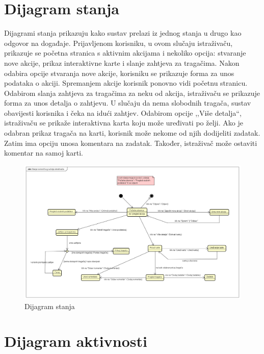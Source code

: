 			
			\eject
		
		\section{Dijagram stanja}
			
			
			Dijagrami stanja prikazuju kako sustav prelazi iz jednog stanja u drugo kao odgovor na događaje. Prijavljenom korisniku, u ovom slučaju istraživaču, prikazuje se početna stranica s aktivnim akcijama i nekoliko opcija: stvaranje nove akcije, prikaz interaktivne karte i slanje zahtjeva za tragačima. Nakon odabira opcije stvaranja nove akcije, korisniku se prikazuje forma za unos podataka o akciji. Spremanjem akcije korisnik ponovno vidi početnu stranicu. Odabirom slanja zahtjeva za tragačima za neku od akcija, istraživaču se prikazuje forma za unos detalja o zahtjevu. U slučaju da nema slobodnih tragača, sustav obavijesti korisnika i čeka na idući zahtjev. Odabirom opcije ,,Više detalja“, istraživaču se prikaže interaktivna karta koju može uređivati po želji. Ako je odabran prikaz tragača na karti, korisnik može nekome od njih dodijeliti zadatak. Zatim ima opciju unosa komentara na zadatak. Također, istraživač može ostaviti komentar na samoj karti.
			
			\begin{figure}[H]
				\includegraphics[scale=0.3]{dijagrami/DijStanja.png} 
				\centering
				\caption{Dijagram stanja}
				\label{fig:promjene}
			\end{figure}
			
			
			\eject 
		
		\section{Dijagram aktivnosti}
			

